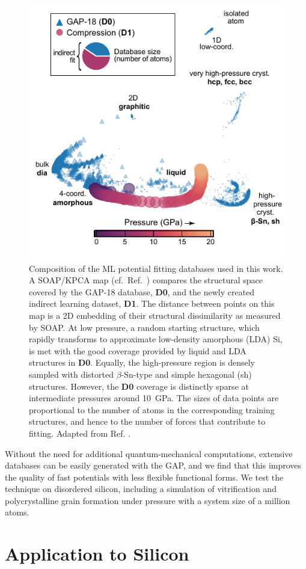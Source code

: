\documentclass[12pt,a4paper,twoside,nobind]{ociamthesis}
\begin{document}
\begin{figure}[ht]
  \includegraphics[width=0.6\linewidth]{soap_map.pdf}
  \centering
  \caption{
    Composition of the ML potential fitting databases used in this work.
    A SOAP/KPCA map (cf.\ Ref.\ \cite{Cheng2020}) compares the structural space covered by the GAP-18 database,\autocite{Bartok2018} \textbf{D0}, 
    and the newly created indirect learning dataset, \textbf{D1}. 
    The distance between points on this map is a 2D embedding of their structural dissimilarity as measured by SOAP.\autocite{Bartok2013} 
    At low pressure, a random starting structure, which rapidly transforms to approximate low-density amorphous (LDA) Si, 
    is met with the good coverage provided by liquid and LDA structures in \textbf{D0}. 
    Equally, the high-pressure region is densely sampled with distorted $\beta$-Sn-type and simple hexagonal (sh) structures. 
    However, the \textbf{D0} coverage is distinctly sparse at intermediate pressures around \SI{10}{GPa}.
    The sizes of data points are proportional to the number of atoms in the corresponding training structures, and hence to the number of forces that contribute to fitting.  
    Adapted from Ref. \cite{Morrow2022}.
  }
  \label{fig:soap_map}
\end{figure}

Without the need for additional quantum-mechanical computations, extensive databases can be easily generated with the GAP,
and we find that this improves the quality of fast potentials with less flexible functional forms.
We test the technique on disordered silicon, 
including a simulation of vitrification and polycrystalline grain formation under pressure with a system size of a million atoms.



\section{Application to Silicon}
\end{document}
